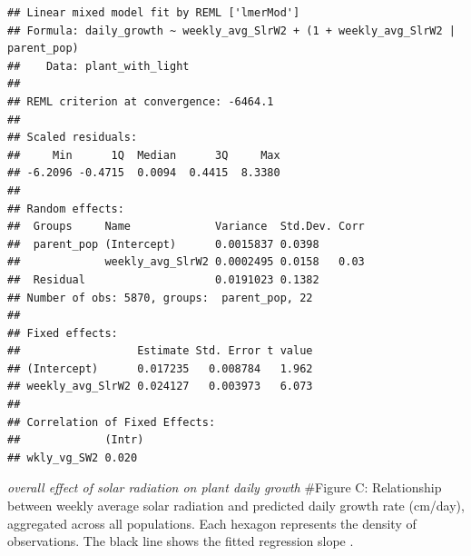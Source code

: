\documentclass[
]{article}
\begin{document}
\begin{verbatim}
## Linear mixed model fit by REML ['lmerMod']
## Formula: daily_growth ~ weekly_avg_SlrW2 + (1 + weekly_avg_SlrW2 | parent_pop)
##    Data: plant_with_light
## 
## REML criterion at convergence: -6464.1
## 
## Scaled residuals: 
##     Min      1Q  Median      3Q     Max 
## -6.2096 -0.4715  0.0094  0.4415  8.3380 
## 
## Random effects:
##  Groups     Name             Variance  Std.Dev. Corr
##  parent_pop (Intercept)      0.0015837 0.0398       
##             weekly_avg_SlrW2 0.0002495 0.0158   0.03
##  Residual                    0.0191023 0.1382       
## Number of obs: 5870, groups:  parent_pop, 22
## 
## Fixed effects:
##                  Estimate Std. Error t value
## (Intercept)      0.017235   0.008784   1.962
## weekly_avg_SlrW2 0.024127   0.003973   6.073
## 
## Correlation of Fixed Effects:
##             (Intr)
## wkly_vg_SW2 0.020
\end{verbatim}

\emph{overall effect of solar radiation on plant daily growth} \#Figure
C: Relationship between weekly average solar radiation and predicted
daily growth rate (cm/day), aggregated across all populations. Each
hexagon represents the density of observations. The black line shows the
fitted regression slope .
\end{document}
